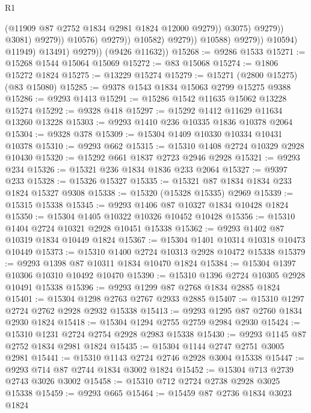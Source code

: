 \begin{lexlean}{R1}
\begin{coremodule}
                                                (@11909 @87 @2752 @1834 @2981 @1824 @12000 @9279))
                                              @3075)
                                            @9279))
                                        @3081)
                                      @9279))
                                  @10576)
                                @9279))
                            @10582)
                          @9279))
                      @10588)
                    @9279))
                @10594)
              @11949)
            @13491)
          @9279))
      (@9426 @11632))
@15268 := @9286 @1533
@15271 := @15268 @1544 @15064 @15069
@15272 := @83 @15068
@15274 := @1806 @15272 @1824
@15275 := @13229 @15274
@15279 := @15271 (@2800 @15275) (@83 @15080)
@15285 := @9378 @1543 @1834 @15063 @2799 @15275 @9388
@15286 := @9293 @1413
@15291 := @15286 @1542 @11635 @15062 @13228 @15274
@15292 := @9328 @418
@15297 := @15292 @1412 @11629 @11634 @13260 @13228
@15303 := @9293 @1410 @236 @10335 @1836 @10378 @2064
@15304 := @9328 @378
@15309 := @15304 @1409 @10330 @10334 @10431 @10378
@15310 := @9293 @662
@15315 := @15310 @1408 @2724 @10329 @2928 @10430
@15320 := @15292 @661 @1837 @2723 @2946 @2928
@15321 := @9293 @234
@15326 := @15321 @236 @1834 @1836 @233 @2064
@15327 := @9397 @233
@15328 := @15326 @15327
@15335 := @15321 @87 @1834 @1834 @233 @1824 @15327 @9308
@15338 := @15320 (@15328 @15335) @2969
@15339 := @15315 @15338
@15345 := @9293 @1406 @87 @10327 @1834 @10428 @1824
@15350 := @15304 @1405 @10322 @10326 @10452 @10428
@15356 := @15310 @1404 @2724 @10321 @2928 @10451 @15338
@15362 := @9293 @1402 @87 @10319 @1834 @10449 @1824
@15367 := @15304 @1401 @10314 @10318 @10473 @10449
@15373 := @15310 @1400 @2724 @10313 @2928 @10472 @15338
@15379 := @9293 @1398 @87 @10311 @1834 @10470 @1824
@15384 := @15304 @1397 @10306 @10310 @10492 @10470
@15390 := @15310 @1396 @2724 @10305 @2928 @10491 @15338
@15396 := @9293 @1299 @87 @2768 @1834 @2885 @1824
@15401 := @15304 @1298 @2763 @2767 @2933 @2885
@15407 := @15310 @1297 @2724 @2762 @2928 @2932 @15338
@15413 := @9293 @1295 @87 @2760 @1834 @2930 @1824
@15418 := @15304 @1294 @2755 @2759 @2984 @2930
@15424 := @15310 @1231 @2724 @2754 @2928 @2983 @15338
@15430 := @9293 @1145 @87 @2752 @1834 @2981 @1824
@15435 := @15304 @1144 @2747 @2751 @3005 @2981
@15441 := @15310 @1143 @2724 @2746 @2928 @3004 @15338
@15447 := @9293 @714 @87 @2744 @1834 @3002 @1824
@15452 := @15304 @713 @2739 @2743 @3026 @3002
@15458 := @15310 @712 @2724 @2738 @2928 @3025 @15338
@15459 := @9293 @665
@15464 := @15459 @87 @2736 @1834 @3023 @1824

\end{coremodule}
\end{lexlean}
